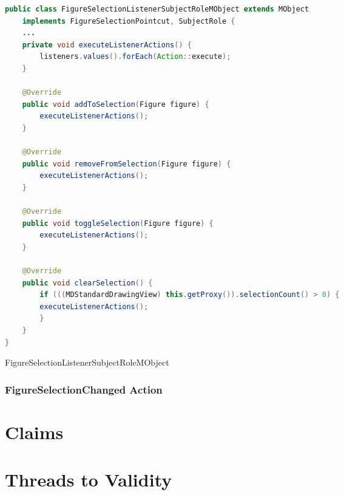 \begin{sourcecode} [H]
	\begin{lstlisting}[language=Java, escapechar=|]
public class FigureSelectionListenerSubjectRoleMObject extends MObject 
	implements FigureSelectionPointcut, SubjectRole {
	...	
	private void executeListenerActions() {
		listeners.values().forEach(Action::execute);
	}

	@Override
	public void addToSelection(Figure figure) {
		executeListenerActions();
	}

	@Override
	public void removeFromSelection(Figure figure) {
		executeListenerActions();
	}

	@Override
	public void toggleSelection(Figure figure) {
		executeListenerActions();
	}

	@Override
	public void clearSelection() {
		if (((MDStandardDrawingView) this.getProxy()).selectionCount() > 0) {
		executeListenerActions();
		}
	}
}
	\end{lstlisting}
	\caption{FigureSelectionListenerSubjectRoleMObject}
	\label{lst:FigureSelectionListenerSubjectRoleMObject}
\end{sourcecode}



\subsubsection{FigureSelectionChanged Action}


\section{Claims}

\section{Threads to Validity}

